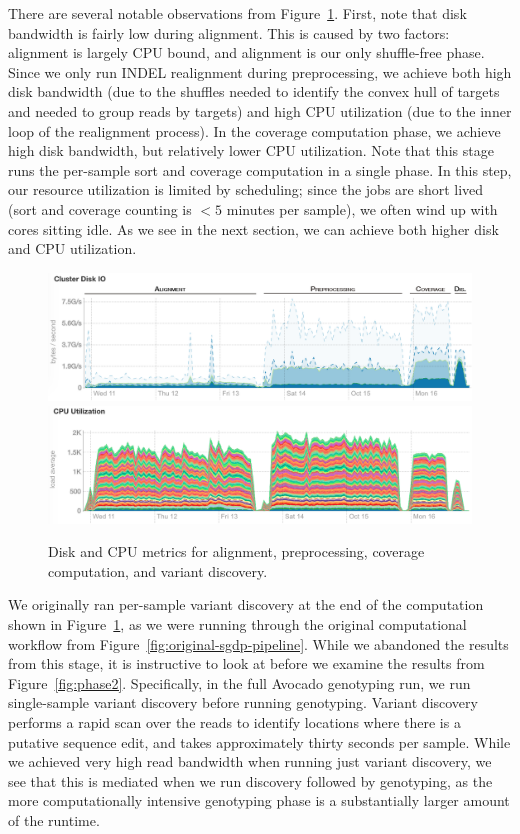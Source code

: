\documentclass[phd]{ucbthesis}
\begin{document}
There are several notable observations from Figure~\ref{fig:phase1}. First,
note that disk bandwidth is fairly low during alignment. This is caused by two
factors: alignment is largely CPU bound, and alignment is our only shuffle-free
phase. Since we only run INDEL realignment during preprocessing, we achieve both
high disk bandwidth (due to the shuffles needed to identify the convex hull of
targets and needed to group reads by targets) and high CPU utilization (due to
the inner loop of the realignment process). In the coverage computation phase,
we achieve high disk bandwidth, but relatively lower CPU utilization. Note that
this stage runs the per-sample sort and coverage computation in a single phase.
In this step, our resource utilization is limited by scheduling; since the jobs
are short lived (sort and coverage counting is $<5$ minutes per sample), we
often wind up with cores sitting idle. As we see in the next section, we can
achieve both higher disk and CPU utilization.

\begin{figure}[h]
  \begin{center}
    \includegraphics[width=0.95\linewidth]{graphs/phase1-disk.png}
    \includegraphics[width=0.95\linewidth]{graphs/phase1-cpu.png}
  \end{center}
  \caption{Disk and CPU metrics for alignment, preprocessing, coverage
    computation, and variant discovery.}
  \label{fig:phase1}
\end{figure}

We originally ran per-sample variant discovery at the end of the computation
shown in Figure~\ref{fig:phase1}, as we were running through the original
computational workflow from Figure~\ref{fig:original-sgdp-pipeline}. While we
abandoned the results from this stage, it is instructive to look at before we
examine the results from Figure~\ref{fig:phase2}. Specifically, in the full
Avocado genotyping run, we run single-sample variant discovery before running
genotyping. Variant discovery performs a rapid scan over the reads to identify
locations where there is a putative sequence edit, and takes approximately
thirty seconds per sample. While we achieved very high read bandwidth when
running just variant discovery, we see that this is mediated when we run
discovery followed by genotyping, as the more computationally intensive
genotyping phase is a substantially larger amount of the runtime.
\end{document}
